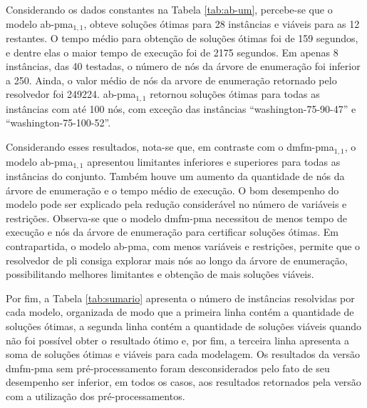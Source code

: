 Considerando os  dados constantes  na Tabela  \ref{tab:ab-um}, percebe-se  que o
modelo  \gls{ab-pma}$_{1,  1}$, obteve  soluções  ótimas  para 28  instâncias  e
viáveis para as 12 restantes. O tempo médio para obtenção de soluções ótimas foi
de 159 segundos, e  dentre elas o maior tempo de execução  foi de 2175 segundos.
Em apenas 8 instâncias, das 40 testadas, o número de nós da árvore de enumeração
foi  inferior a  250.  Ainda, o  valor  médio  de nós  da  arvore de  enumeração
retornado pelo  resolvedor foi  249224. \gls{ab-pma}$_{1, 1}$  retornou soluções
ótimas para  todas as  instâncias com  até 100 nós,  com exceção  das instâncias
``washington-75-90-47'' e ``washington-75-100-52''.

Considerando   esses    resultados,   nota-se   que,   em    contraste   com   o
\gls{dmfm-pma}$_{1, 1}$,  o modelo  \gls{ab-pma}$_{1, 1}$  apresentou limitantes
inferiores e  superiores para todas as  instâncias do conjunto. Também  houve um
aumento  da quantidade  de  nós da  árvore  de  enumeração e  o  tempo médio  de
execução.  O  bom   desempenho  do  modelo  pode  ser   explicado  pela  redução
considerável  no número  de  variáveis  e restrições.  Observa-se  que o  modelo
\gls{dmfm-pma}  necessitou  de menos  tempo  de  execução  e  nós da  árvore  de
enumeração  para   certificar  soluções  ótimas.  Em   contrapartida,  o  modelo
\gls{ab-pma},  com menos  variáveis e  restrições, permite  que o  resolvedor de
\gls{pli}  consiga  explorar  mais  nós   ao  longo  da  árvore  de  enumeração,
possibilitando melhores limitantes e obtenção de mais soluções viáveis.

\newpage
Por fim, a Tabela \ref{tab:sumario}  apresenta o número de instâncias resolvidas
por cada modelo, organizada de modo que  a primeira linha contém a quantidade de
soluções ótimas, a segunda linha contém  a quantidade de soluções viáveis quando
não foi possível obter o resultado ótimo  e, por fim, a terceira linha apresenta
a soma de soluções ótimas e viáveis para cada modelagem. Os resultados da versão
\gls{dmfm-pma}  sem pré-processamento  foram  desconsiderados pelo  fato de  seu
desempenho  ser inferior,  em todos  os  casos, aos  resultados retornados  pela
versão com a utilização dos pré-processamentos.

\begin{table}[!ht]
\centering
{}

\caption{Contagem de soluções dos modelos.}
\label{tab:sumario}
\end{table}

